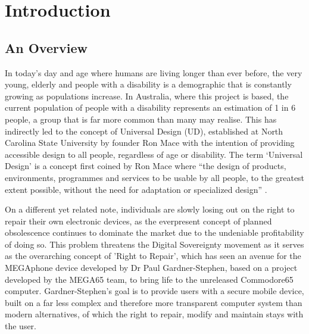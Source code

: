 
\chapter{Introduction}\label{chapter:firstchapter} %

\label{Chapter1} %


\section{An Overview}\label{sec:firstsection}

In today's day and age where humans are living longer than ever before, the very young, elderly and people with a disability is a demographic that is constantly growing as populations increase.
In Australia, where this project is based, the current population of people with a disability represents an estimation of 1 in 6 people\cite{ausstats}, a group that is far more common than many may realise.
This has indirectly led to the concept of Universal Design (UD), established at North Carolina State University by founder Ron Mace with the intention of providing accessible design to all people, regardless of age or disability\cite{ronald}.
The term ‘Universal Design’ is a concept first coined by Ron Mace where “the design of products, environments, programmes and services to be usable by all people, to the greatest extent possible, without the need for adaptation or specialized design” \cite{nda}. 

On a different yet related note, individuals are slowly losing out on the right to repair their own electronic devices, as the everpresent concept of planned obsolescence continues to dominate the market due to the undeniable profitability of doing so\cite{obsolescence2}.
This problem threatens the Digital Sovereignty movement as it serves as the overarching concept of 'Right to Repair', which has seen an avenue for the MEGAphone device developed by Dr Paul Gardner-Stephen\cite{mobilehistory}, based on a project developed by the MEGA65 team\cite{mega65}, to bring life to the unreleased Commodore65 computer. %
Gardner-Stephen's goal is to provide users with a secure mobile device, built on a far less complex and therefore more transparent computer system than modern alternatives, of which the right to repair, modify and maintain stays with the user.


